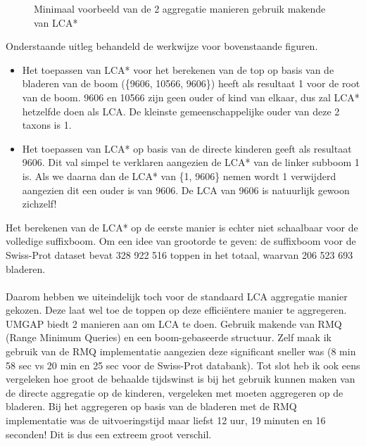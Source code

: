 \begin{figure}[H]
    \centering
    \hspace{0.25\textwidth}%
    \caption{Minimaal voorbeeld van de 2 aggregatie manieren gebruik makende van LCA*}\label{fig:lca*_diff}
\end{figure}

Onderstaande uitleg behandeld de werkwijze voor bovenstaande figuren.
\begin{itemize}
    \item Het toepassen van LCA* voor het berekenen van de top op basis van de bladeren van de boom (\{9606, 10566, 9606\}) heeft als resultaat 1 voor de root van de boom.
    9606 en 10566 zijn geen ouder of kind van elkaar, dus zal LCA* hetzelfde doen als LCA\@.
    De kleinste gemeenschappelijke ouder van deze 2 taxons is 1.
    \item Het toepassen van LCA* op basis van de directe kinderen geeft als resultaat 9606.
    Dit val simpel te verklaren aangezien de LCA* van de linker subboom 1 is.
    Als we daarna dan de LCA* van \{1, 9606\} nemen wordt 1 verwijderd aangezien dit een ouder is van 9606.
    De LCA van 9606 is natuurlijk gewoon zichzelf!
\end{itemize}

Het berekenen van de LCA* op de eerste manier is echter niet schaalbaar voor de volledige suffixboom.
Om een idee van grootorde te geven: de suffixboom voor de Swiss-Prot dataset bevat 328 922 516 toppen in het totaal, waarvan 206 523 693 bladeren.
\\ \\
Daarom hebben we uiteindelijk toch voor de standaard LCA aggregatie manier gekozen.
Deze laat wel toe de toppen op deze efficiëntere manier te aggregeren.
UMGAP biedt 2 manieren aan om LCA te doen.
Gebruik makende van RMQ (Range Minimum Queries) en een boom-gebaseerde structuur.
Zelf maak ik gebruik van de RMQ implementatie aangezien deze significant sneller was (8 min 58 sec vs 20 min en 25 sec voor de Swiss-Prot databank).
Tot slot heb ik ook eens vergeleken hoe groot de behaalde tijdswinst is bij het gebruik kunnen maken van de directe aggregatie op de kinderen, vergeleken met moeten aggregeren op de bladeren.
Bij het aggregeren op basis van de bladeren met de RMQ implementatie was de uitvoeringstijd maar liefst 12 uur, 19 minuten en 16 seconden!
Dit is dus een extreem groot verschil.

